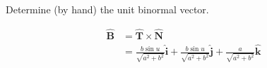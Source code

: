 Determine (by hand) the unit binormal vector.

\begin{solution}
\begin{align*}
    \boldsymbol{\hat{B}} &= \boldsymbol{\hat{T}} \times \boldsymbol{\hat{N}} \\
    &= \frac{b\sin u}{\sqrt{a^2+b^2}} \hat{\boldsymbol{i}} + \frac{b\sin u}{\sqrt{a^2+b^2}} \hat{\boldsymbol{j}} + \frac{a}{\sqrt{a^2+b^2}} \hat{\boldsymbol{k}}
\end{align*}
\end{solution}
